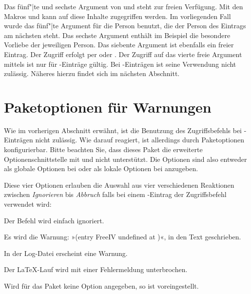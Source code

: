 Das fünf"|te und sechste Argument von  und
 steht zur freien Verfügung.  Mit den Makros
 und  kann auf diese Inhalte zugegriffen werden. Im
vorliegenden Fall wurde das fünf"|te Argument für die Person benutzt, die der
Person des Eintrags am nächsten steht. Das sechste Argument enthält im
Beispiel die besondere Vorliebe der jeweiligen Person.  Das siebente Argument
ist ebenfalls ein freier Eintrag. Der Zugriff erfolgt per  oder
.  Der Zugriff auf das vierte freie Argument mittels
 ist nur für -Einträge gültig.
Bei -Einträgen ist seine Verwendung nicht
zulässig. Näheres hierzu findet sich im nächsten Abschnitt.
%
\EndIndexGroup
\EndIndexGroup

\section{Paketoptionen für Warnungen}

Wie im vorherigen Abschnitt erwähnt, ist die Benutzung des Zugriffsbefehls
 bei -Einträgen nicht
zulässig. Wie  darauf reagiert, ist allerdings durch
Paketoptionen konfigurierbar. Bitte beachten Sie, dass
dieses Paket die erweiterte Optionenschnittstelle mit
 und  nicht
unterstützt. Die Optionen sind also entweder als globale Optionen bei
 oder als lokale Optionen bei
 anzugeben.


\begin{Declaration}
\end{Declaration}
Diese vier Optionen erlauben die Auswahl aus vier verschiedenen Reaktionen
zwischen \emph{Ignorieren} bis \emph{Abbruch} falls bei einem
-Eintrag der Zugriffsbefehl 
verwendet wird:
%
\begin{labeling}[~--]{}
\item[\Option{adrFreeIVempty}] 
        Der Befehl  wird einfach ignoriert.
\item[\Option{adrFreeIVshow}] 
        Es wird die Warnung: »(entry FreeIV undefined at )«,
           in den Text geschrieben.
\item[\Option{adrFreeIVwarn}]
        In der Log-Datei erscheint eine Warnung.
\item[\Option{adrFreeIVstop}]
        Der \LaTeX{}-Lauf wird mit einer Fehlermeldung unterbrochen.
\end{labeling}
Wird für das Paket keine Option angegeben, so ist 
voreingestellt.%
\EndIndexGroup
%
\EndIndexGroup
\endinput



